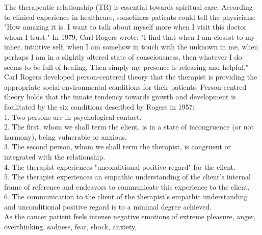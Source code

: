\documentclass[jpm,article,submit,moreauthors,pdftex]{Definitions/mdpi}
\begin{document}
\begin{paracol}{2}
The therapeutic relationship (TR) is essential towards spiritual care.
According to clinical experience in healthcare, sometimes patients could tell the physicians: "How amazing it is. I want to talk about myself more when I visit this doctor whom I trust."
In 1979, Carl Rogers wrote\cite{Rogers1979}: "I find that when I am closest to my inner, intuitive self, when I am somehow in touch with the unknown in me, when perhaps I am in a slightly altered state of consciousness, then whatever I do seems to be full of healing. Then simply my presence is releasing and helpful."
Carl Rogers developed person-centered theory that the therapist is providing the appropriate social-environmental conditions for their patients\cite{Rogers1957}\cite{Joseph2004}\cite{Griffiths2013}.
Person-centred theory holds that the innate tendency towards growth and development is facilitated by the six conditions described by Rogers in 1957\cite{Rogers1957}:\\
1. Two persons are in psychological contact. \\
2. The first, whom we shall term the client, is in a state of incongruence (or not harmony), being vulnerable or anxious. \\
3. The second person, whom we shall term the therapist, is congruent
or integrated with the relationship. \\
4. The therapist experiences "unconditional positive regard" for the client. \\
5. The therapist experiences an empathic understanding of the client's
internal frame of reference and endeavors to communicate this experience to the client. \\
6. The communication to the client of the therapist's empathic understanding and unconditional positive regard is to a minimal degree achieved.\\
As the cancer patient feels intense negative emotions of extreme pleasure, anger, overthinking, sadness, fear, shock, anxiety, 

\end{paracol}
\end{document}
